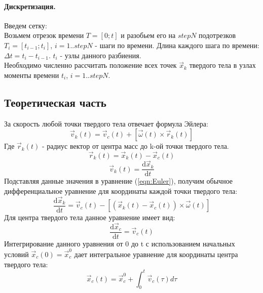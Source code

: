 \documentclass[12pt,a4paper]{article}
\begin{document}
\paragraph{Дискретизация.}
Введем сетку:\\
Возьмем отрезок времени $T=[0;t]$ и разобьем его на $stepN$ подотрезков $T_i=[t_{i-1}; t_i]$, $i=1..stepN$ - шаги по времени. Длина каждого шага по времени: $\Delta t= t_i-t_{i-1}$. $t_i$ - узлы данного разбиения.\\
Необходимо численно рассчитать положение всех точек $\overrightarrow{x}_k$ твердого тела в узлах  моменты времени $t_i$, $i=1..stepN$.

\subsection{Теоретическая часть}
За скорость любой точки твердого тела отвечает формула Эйлера:
\begin{equation}
\label{eqn:Euler}
\overrightarrow{v}_k(t)=\overrightarrow{v}_c(t)+[\overrightarrow{\omega}(t)\times\overrightarrow{r}_k(t)]
\end{equation}
Где $\overrightarrow{r}_k(t)$ - радиус вектор от центра масс до k-ой точки твердого тела.
\begin{equation}
\overrightarrow{r}_k(t)=\overrightarrow{x}_k(t)-\overrightarrow{x}_c(t)
\end{equation}
\begin{equation}
\overrightarrow{v}_k(t)=\frac{\text{d}\overrightarrow{x}_k}{\text{d}t}
\end{equation}
Подставляя данные значения в уравнение (\ref{eqn:Euler}), получим обычное дифференциальное уравнение для координаты каждой точки твердого тела:
\begin{equation}
\label{eqn:xk_ode}
\frac{\text{d}\overrightarrow{x}_k}{\text{d}t}=\overrightarrow{v}_c(t)-[(\overrightarrow{x}_k(t)-\overrightarrow{x}_c(t))\times\overrightarrow{\omega}(t)]
\end{equation}
Для центра твердого тела данное уравнение имеет вид:
\begin{equation}
\label{eqn:xc_ode}
\frac{\text{d}\overrightarrow{x}_c}{\text{d}t}=\overrightarrow{v}_c(t)
\end{equation}
Интегрирование данного уравнения от 0 до t с использованием начальных условий $\overrightarrow{x}_c(0) = \overrightarrow{x}_c^0$ дает интегральное уравнение для координаты центра твердого тела:
\begin{equation}
\label{eqn:xc_ie}
\overrightarrow{x}_c(t) = \overrightarrow{x}_c^0+\int_{0}^{t} \overrightarrow{v}_c(\tau)d\tau
\end{equation}
\end{document}
